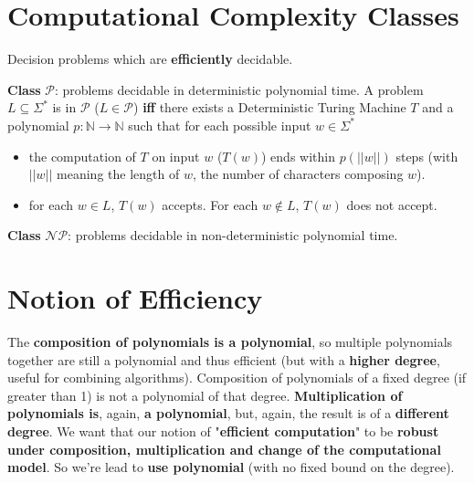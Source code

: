 	\section{Computational Complexity Classes}
	Decision problems which are \textbf{efficiently} decidable.
	\begin{definition}
	 \textbf{Class} $\mathcal{P}$: problems decidable in deterministic polynomial time. A problem $L \subseteq \Sigma^\ast$ is in $\mathcal{P}$ ($L \in \mathcal{P}$) \textbf{iff} there exists a Deterministic Turing Machine $T$ and a polynomial $p: \mathbb{N} \rightarrow \mathbb{N}$ such that for each possible input $w \in \Sigma^\ast$
	\begin{itemize}
		\item the computation of $T$ on input $w$ ($T(w)$) ends within $p(||w||)$ steps (with $||w||$ meaning the length of $w$, the number of characters composing $w$).
		\item for each $w \in L$, $T(w)$ accepts. For each $w \notin L$, $T(w)$ does not accept.
	\end{itemize}
	\end{definition}

	\begin{definition} \textbf{Class} $\mathcal{NP}$: problems decidable in non-deterministic polynomial time.
	\end{definition}

	\newpage

	\section*{Notion of Efficiency}

	The \textbf{composition of polynomials is a polynomial}, so multiple polynomials together are still a polynomial and thus efficient (but with a \textbf{higher degree}, useful for combining algorithms). Composition of polynomials of a fixed degree (if greater than 1) is not a polynomial of that degree. \textbf{Multiplication of polynomials is}, again, \textbf{a polynomial}, but, again, the result is of a \textbf{different degree}. We want that our notion of "\textbf{efficient computation}" to be \textbf{robust under composition, multiplication and change of the computational model}. So we're lead to \textbf{use polynomial} (with no fixed bound on the degree).

